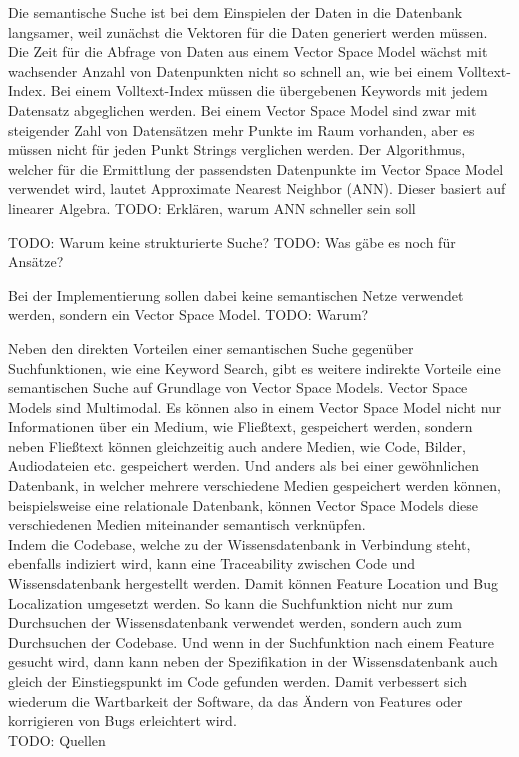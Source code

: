 Die semantische Suche ist bei dem Einspielen der Daten in die Datenbank langsamer, weil zunächst die Vektoren für die Daten generiert werden müssen.
Die Zeit für die Abfrage von Daten aus einem Vector Space Model wächst mit wachsender Anzahl von Datenpunkten nicht so schnell an, wie bei einem Volltext-Index.
Bei einem Volltext-Index müssen die übergebenen Keywords mit jedem Datensatz abgeglichen werden.
Bei einem Vector Space Model sind zwar mit steigender Zahl von Datensätzen mehr Punkte im Raum vorhanden, aber es müssen nicht für jeden Punkt Strings verglichen werden.
Der Algorithmus, welcher für die Ermittlung der passendsten Datenpunkte im Vector Space Model verwendet wird, lautet Approximate Nearest Neighbor (ANN).
Dieser basiert auf linearer Algebra.
TODO: Erklären, warum ANN schneller sein soll

TODO: Warum keine strukturierte Suche?
TODO: Was gäbe es noch für Ansätze?

Bei der Implementierung sollen dabei keine semantischen Netze verwendet werden, sondern ein Vector Space Model.
TODO: Warum?

Neben den direkten Vorteilen einer semantischen Suche gegenüber Suchfunktionen, wie eine Keyword Search, gibt es weitere indirekte Vorteile eine semantischen Suche auf Grundlage von Vector Space Models.
Vector Space Models sind Multimodal.
Es können also in einem Vector Space Model nicht nur Informationen über ein Medium, wie Fließtext, gespeichert werden, sondern neben Fließtext können gleichzeitig auch andere Medien, wie Code, Bilder, Audiodateien etc. gespeichert werden.
Und anders als bei einer gewöhnlichen Datenbank, in welcher mehrere verschiedene Medien gespeichert werden können, beispielsweise eine relationale Datenbank, können Vector Space Models diese verschiedenen Medien miteinander semantisch verknüpfen.\\

Indem die Codebase, welche zu der Wissensdatenbank in Verbindung steht, ebenfalls indiziert wird, kann eine Traceability zwischen Code und Wissensdatenbank hergestellt werden.
Damit können Feature Location und Bug Localization umgesetzt werden.
So kann die Suchfunktion nicht nur zum Durchsuchen der Wissensdatenbank verwendet werden, sondern auch zum Durchsuchen der Codebase.
Und wenn in der Suchfunktion nach einem Feature gesucht wird, dann kann neben der Spezifikation in der Wissensdatenbank auch gleich der Einstiegspunkt im Code gefunden werden.
Damit verbessert sich wiederum die Wartbarkeit der Software, da das Ändern von Features oder korrigieren von Bugs erleichtert wird.\\
TODO: Quellen

